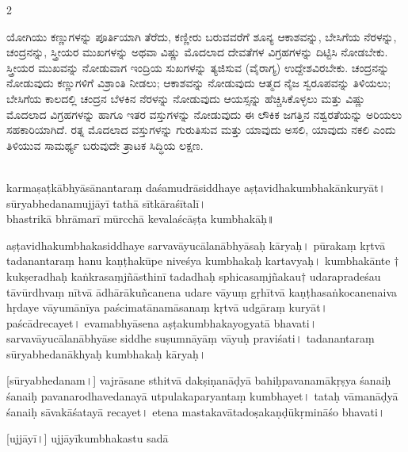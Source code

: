 \begin{multicols}{2}
\begin{kan}

ಯೋಗಿಯು ಕಣ್ಣುಗಳನ್ನು ಪೂರ್ತಿಯಾಗಿ ತೆರೆದು, ಕಣ್ಣೀರು ಬರುವವರೆಗೆ ಶೂನ್ಯ ಆಕಾಶವನ್ನು, ಬೇಸಿಗೆಯ ನೆರಳನ್ನು, ಚಂದ್ರನನ್ನು, ಸ್ತ್ರೀಯರ ಮುಖಗಳನ್ನು ಅಥವಾ ವಿಷ್ಣು ಮೊದಲಾದ ದೇವತೆಗಳ ವಿಗ್ರಹಗಳನ್ನು ದಿಟ್ಟಿಸಿ ನೋಡಬೇಕು. ಸ್ತ್ರೀಯರ ಮುಖವನ್ನು ನೋಡುವಾಗ ಇಂದ್ರಿಯ ಸುಖಗಳನ್ನು ತ್ಯಜಿಸುವ (ವೈರಾಗ್ಯ) ಉದ್ದೇಶವಿರಬೇಕು. ಚಂದ್ರನನ್ನು ನೋಡುವುದು ಕಣ್ಣುಗಳಿಗೆ ವಿಶ್ರಾಂತಿ ನೀಡಲು; ಆಕಾಶವನ್ನು ನೋಡುವುದು ಆತ್ಮದ ನೈಜ ಸ್ವರೂಪವನ್ನು ತಿಳಿಯಲು; ಬೇಸಿಗೆಯ ಕಾಲದಲ್ಲಿ ಚಂದ್ರನ ಬೆಳಕಿನ ನೆರಳನ್ನು ನೋಡುವುದು ಆಯಸ್ಸನ್ನು ಹೆಚ್ಚಿಸಿಕೊಳ್ಳಲು ಮತ್ತು ವಿಷ್ಣು ಮೊದಲಾದ ವಿಗ್ರಹಗಳನ್ನು ಹಾಗೂ ಇತರ ವಸ್ತುಗಳನ್ನು ನೋಡುವುದು ಈ ಲೌಕಿಕ ಜಗತ್ತಿನ ನಶ್ವರತೆಯನ್ನು ಅರಿಯಲು ಸಹಕಾರಿಯಾಗಿದೆ. ರತ್ನ ಮೊದಲಾದ ವಸ್ತುಗಳನ್ನು ಗುರುತಿಸುವ ಮತ್ತು ಯಾವುದು ಅಸಲಿ, ಯಾವುದು ನಕಲಿ ಎಂದು ತಿಳಿಯುವ ಸಾಮರ್ಥ್ಯ ಬರುವುದೇ ತ್ರಾಟಕ ಸಿದ್ಧಿಯ ಲಕ್ಷಣ.
\end{kan}
\end{multicols}

\newpage

{}




\newpage

\begin{HalfText}
\begin{sans}
\\%
karmaṣaṭkābhyāsānantaraṃ daśamudrāsiddhaye aṣṭavidhakumbhakānkuryāt\!।\\
sūryabhedanamujjāyī tathā sītkāraśītalī\endnote{sītkāra°~] P, sītkā M (\textit{unmetrical})}\!।\\
bhastrikā bhrāmarī mūrcchā kevalaścāṣṭa kumbhakāḥ\endnote{kumbhakāḥ~] P, kumbhakā M.}\!॥%

aṣṭavidhakumbhakasiddhaye sarvavāyucālanābhyāsaḥ\endnote{°bhyāsaḥ~] \textit{conj.}, °virbhāvaḥ M.} kāryaḥ\!। pūrakaṃ kṛtvā tadanantaraṃ hanu\endnote{hanuṃ~] \textit{emend.}, hanu M.} kaṇṭhakūpe niveśya  kumbhakaḥ kartavyaḥ\!। kumbhakānte $\dagger$kukṣeradhaḥ kaṅkrasaṃjñāsthinī tadadhaḥ sphicasaṃjñakau$\dagger$ udarapradeśau tāvūrdhvaṃ nītvā ādhārākuñcanena udare vāyuṃ gṛhītvā kaṇṭhasaṅkocanenaiva hṛdaye vāyumānīya paścimatānamāsanaṃ kṛtvā udgāraṃ kuryāt\!। paścādrecayet\!। evamabhyāsena aṣṭakumbhakayogyatā bhavati\!। sarvavāyucālanābhyāse siddhe suṣumnāyāṃ vāyuḥ praviśati\!। tadanantaraṃ sūryabhedanākhyaḥ\endnote{sūryabhedanākhyaḥ~] \textit{emend.},  sūryadanākhyaḥ M.} kumbhakaḥ kāryaḥ\!। 

[sūryabhedanam\!।]
vajrāsane sthitvā dakṣiṇanāḍyā bahiḥpavanamākṛṣya śanaiḥ śanaiḥ pavanarodhavedanayā utpulakaparyantaṃ kumbhayet\!। tataḥ vāmanāḍyā śanaiḥ sāvakāśatayā recayet\!। etena mastakavātadoṣakaṇḍūkṛmināśo bhavati\!।

[ujjāyī\!।]
ujjāyīkumbhakastu sadā 
\end{sans}
\end{HalfText}

